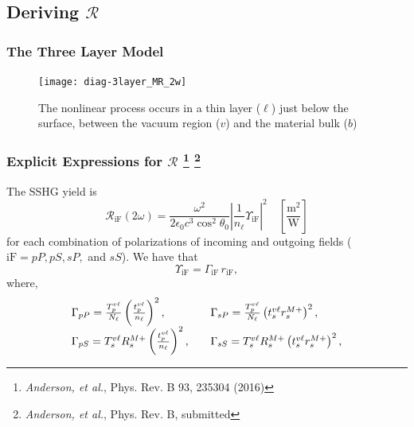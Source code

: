 \documentclass{beamer}
\begin{document}

\subsection{Deriving \texorpdfstring{$\mathcal{R}$}{R}}

\begin{frame}
\frametitle{The Three Layer Model}
\begin{figure}
\centering
\texttt{[image: diag-3layer\_MR\_2w]}
\caption{The nonlinear process occurs in a thin layer ($\ell$) just below the
surface, between the vacuum region ($v$) and the material bulk ($b$)}
\end{figure}
\end{frame}

\begin{frame}
\frametitle{Explicit Expressions for $\mathcal{R}$%
\footnote{\emph{Anderson, et al.}, Phys. Rev. B 93, 235304 (2016)}
\footnote{\emph{Anderson, et al.}, Phys. Rev. B, submitted}
}
The SSHG yield is
\begin{equation*}
\mathcal{R}_{\mathrm{iF}}(2\omega) =
\frac{\omega^{2}}{2\epsilon_{0}c^3\cos^{2}\theta_{0}}
\left\vert\frac{1}{n_{\ell}}\Upsilon_{\mathrm{iF}}\right\vert^{2}
\quad\left[\frac{\mathrm{m}^{2}}{\mathrm{W}}\right]
\end{equation*}
for each combination of polarizations of incoming and outgoing fields
($\mathrm{iF} = pP, pS, sP,$ and $sS$). We have that
\begin{equation*}\label{eq:mc25}
\Upsilon_{\mathrm{iF}} = \Gamma_{\mathrm{iF}}\,r_{\mathrm{iF}},
\end{equation*}
where,
$$
\begin{array}{ l l }
\Gamma_{pP} =
\frac{T^{v\ell}_{p}}{N_{\ell}}
\left(\frac{t^{v\ell}_{p}}{n_{\ell}}\right)^{2},
&
\Gamma_{sP}=
\frac{T^{v\ell}_{p}}{N_{\ell}}
\left(t^{v\ell}_{s}r^{M+}_{s}\right)^{2},\quad\\
\Gamma_{pS} =
T_{s}^{v\ell}R^{M+}_{s}
\left(\frac{t^{v\ell}_{p}}{n_{\ell}}\right)^{2},\quad
&
\Gamma_{sS} = 
T_{s}^{v\ell}R^{M+}_{s}\left(t^{v\ell}_{s}r^{M+}_{s}\right)^{2},
\end{array}
$$
\end{frame}
\end{document}

